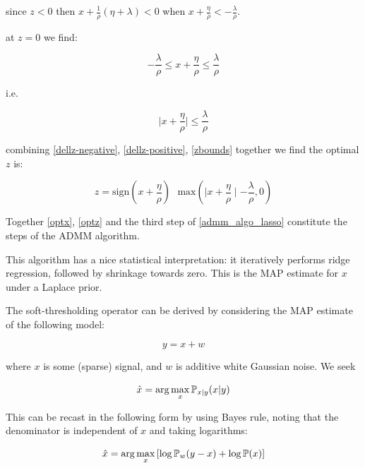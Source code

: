 \documentclass{article}
\begin{document}
since \(z<0\) then \(x + \frac{1}{\rho} ( \eta + \lambda ) < 0\) when \(x + \frac{\eta}{\rho} < - \frac{\lambda}{\rho}\).

at \(z=0\) we find:

\begin{equation*}
-\frac{\lambda}{\rho} \leq x + \frac{\eta}{\rho} \leq \frac{\lambda}{\rho}
\end{equation*}

i.e.

\begin{equation}
\mid x+ \frac{\eta}{\rho}\mid \leq \frac{\lambda}{\rho}
\label{zbounds}
\end{equation}

combining \eqref{dellz-negative}, \eqref{dellz-positive}, \eqref{zbounds} together we find the optimal \(z\) is:

\begin{equation}
z = \mathrm{sign}(x+\frac{\eta}{\rho})\text{ }\mathrm{max}\left( \mid x+\frac{\eta}{\rho} \mid - \frac{\lambda}{\rho} ,0\right)
\label{optz}
\end{equation}

Together \eqref{optx}, \eqref{optz} and the third step of \eqref{admm_algo_lasso} constitute the steps of the ADMM algorithm.

This algorithm has a nice statistical interpretation: it iteratively performs ridge regression, followed by shrinkage towards zero. This is the MAP estimate for \(x\) under a Laplace prior.

The soft-thresholding operator can be derived by considering the MAP estimate of the following model:

\begin{equation}
y = x + w
\end{equation}

where \(x\) is some (sparse) signal, and \(w\) is additive white Gaussian noise. We seek

\begin{equation}
\hat{x} = \arg\max_x {\mathbb{P}}_{x|y}{\left(x|y\right)}
\end{equation}

This can be recast in the following form by using Bayes rule, noting that the denominator is independent of \(x\) and taking logarithms:

\begin{equation}
\hat{x} = \arg\max_x \left[\log{{\mathbb{P}}_{w}{\left(y-x\right)}}+\log{{\mathbb{P}}{\left(x\right)}}\right]
\label{hatx}
\end{equation}
\end{document}
